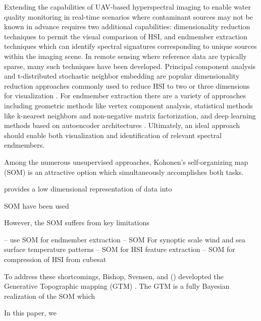 \documentclass{article}
\begin{document}
Extending the capabilities of UAV-based hyperspectral imaging to enable water quality monitoring in real-time scenarios where contaminant sources may not be known in advance requires two additional capabilities: dimensionality reduction techniques to permit the visual comparison of HSI, and endmember extraction techniques which can identify spectral signatures corresponding to unique sources within the imaging scene. In remote sensing where reference data are typically sparse, many such techniques have been developed. Principal component analysis and t-distributed stochastic neighbor embedding are popular dimensionality reduction approaches commonly used to reduce HSI to two or three dimensions for visualization \cite{tyo2003principal,zhang2015hyperspectral}. For endmember extraction there are a variety of approaches including geometric methods like vertex component analysis, statistical methods like k-nearest neighbors and non-negative matrix factorization, and deep learning methods based on autoencoder architectures \cite{heylen2014review,nascimento2005vertex, Feng2022HyperspectralUB, cariou2015unsupervised, su2019daen, borsoi2019deep, palsson2020convolutional}. Ultimately, an ideal approach should enable both visualization and identification of relevant spectral endmembers.

Among the numerous unsupervised approaches, Kohonen's self-organizing map (SOM) is an attractive option which 
simultaneously accomplishes both tasks. 

provides a low dimensional representation of data into 

SOM have been used 

However, the SOM suffers from key limitations

\cite{cantero2004analysis} -- use SOM for endmember extraction
\cite{som-satellite} -- SOM For synoptic scale wind and sea surface temperature patterns
\cite{som-hsi} -- SOM for HSI feature extraction
\cite{danielsen2021self} -- SOM for compression of HSI from cubesat

To address these shortcomings, Bishop, Svensen, and () developted the Generative Topographic mapping (GTM) \cite{gtm-bishop-1}. The GTM is a fully Bayesian realization of the SOM which 



In this paper, we 


\end{document}
